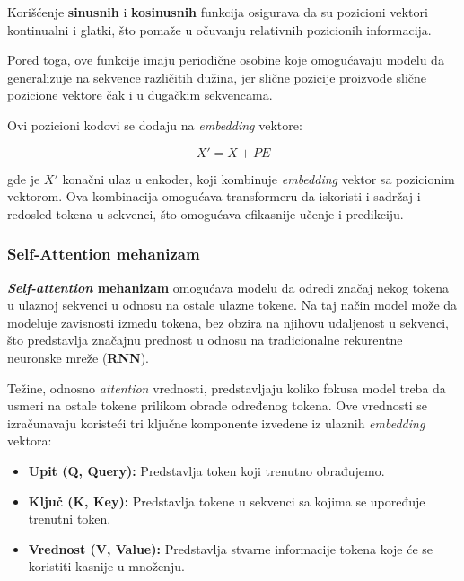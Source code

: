 \documentclass[12pt]{article}
\begin{document}
   Korišćenje \textbf{sinusnih} i \textbf{kosinusnih} funkcija osigurava da su pozicioni vektori
   kontinualni i glatki, što pomaže u očuvanju relativnih pozicionih informacija. 
   
   Pored toga, ove funkcije imaju periodične osobine koje omogućavaju modelu da 
   generalizuje na sekvence različitih dužina, jer slične pozicije proizvode slične 
   pozicione vektore čak i u dugačkim sekvencama.

   Ovi pozicioni kodovi se dodaju na \textit{embedding} vektore:

   \[
   X' = X + PE
   \]

   gde je \(X'\) konačni ulaz u enkoder, koji kombinuje \textit{embedding} vektor 
   sa pozicionim vektorom. Ova kombinacija omogućava transformeru da 
   iskoristi i sadržaj i redosled tokena u sekvenci, što omogućava efikasnije 
   učenje i predikciju.

   \subsubsection*{Self-Attention mehanizam}
   \textbf{\textit{Self-attention} mehanizam} omogućava modelu da odredi značaj nekog 
   tokena u ulaznoj sekvenci u odnosu na ostale ulazne tokene. 
   Na taj način model može da modeluje zavisnosti između tokena, bez obzira na 
   njihovu udaljenost u sekvenci, što predstavlja značajnu prednost u odnosu na 
   tradicionalne rekurentne neuronske mreže (\textbf{RNN}).
 
   Težine, odnosno \textit{attention} vrednosti, predstavljaju koliko fokusa model treba 
   da usmeri na ostale tokene prilikom obrade određenog tokena. 
   Ove vrednosti se izračunavaju koristeći tri ključne komponente izvedene 
   iz ulaznih \textit{embedding} vektora:

   \begin{itemize}
      \item \textbf{Upit (Q, Query):} Predstavlja token koji trenutno obrađujemo.
      \item \textbf{Ključ (K, Key):} Predstavlja tokene u sekvenci sa kojima 
      se upoređuje trenutni token.
      \item \textbf{Vrednost (V, Value):} Predstavlja stvarne informacije tokena koje 
      će se koristiti kasnije u množenju.
  \end{itemize}
  
  \newpage
\end{document}
